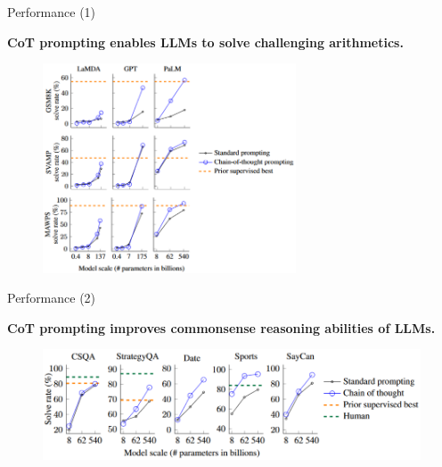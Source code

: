 
\begin{vbframe}{Performance (1)}

\vfill

\textbf{CoT prompting enables LLMs to solve challenging arithmetics.}

\begin{figure}
    \centering
    \includegraphics[width=0.67\textwidth]{figure/cot_performance1.png}\\
\end{figure}

\vfill

\end{vbframe}


\begin{vbframe}{Performance (2)}

\vfill

\textbf{CoT prompting improves commonsense reasoning abilities of LLMs.}

\begin{figure}
    \centering
    \includegraphics{figure/cot_performance2.png}\\
\end{figure}

\vfill

\end{vbframe}

